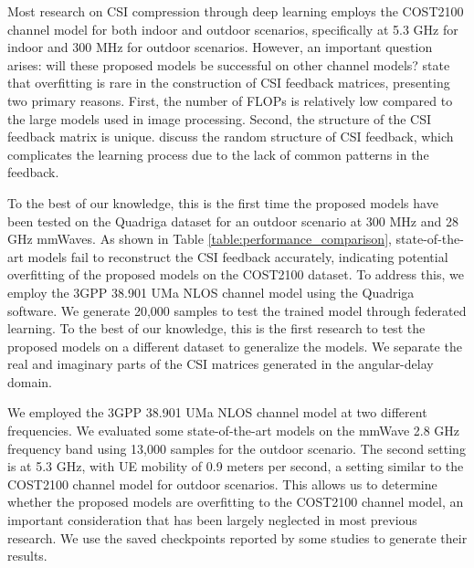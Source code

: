 \documentclass[lettersize,journal]{IEEEtran}
\begin{document}
Most research on CSI compression through deep learning employs the COST2100 channel model for both indoor and outdoor scenarios, specifically at 5.3 GHz for indoor and 300 MHz for outdoor scenarios. However, an important question arises: will these proposed models be successful on other channel models?
\cite{abn} state that overfitting is rare in the construction of CSI feedback matrices, presenting two primary reasons. First, the number of FLOPs is relatively low compared to the large models used in image processing. Second, the structure of the CSI feedback matrix is unique. \cite{abx} discuss the random structure of CSI feedback, which complicates the learning process due to the lack of common patterns in the feedback.

To the best of our knowledge, this is the first time the proposed models have been tested on the Quadriga dataset for an outdoor scenario at 300 MHz and 28 GHz mmWaves. As shown in Table
 \ref{table:performance_comparison}, state-of-the-art models fail to reconstruct the CSI feedback accurately, indicating potential overfitting of the proposed models on the COST2100 dataset. To address this, we employ the 3GPP 38.901 UMa NLOS channel model using the Quadriga software. We generate 20,000 samples to test the trained model through federated learning. To the best of our knowledge, this is the first research to test the proposed models on a different dataset to generalize the models. We separate the real and imaginary parts of the CSI matrices generated in the angular-delay domain.

We employed the 3GPP 38.901 UMa NLOS channel model at two different frequencies. We evaluated some state-of-the-art models on the mmWave 2.8 GHz frequency band using 13,000 samples for the outdoor scenario. The second setting is at 5.3 GHz, with UE mobility of 0.9 meters per second, a setting similar to the COST2100 channel model for outdoor scenarios. This allows us to determine whether the proposed models are overfitting to the COST2100 channel model, an important consideration that has been largely neglected in most previous research. We use the saved checkpoints reported by some studies to generate their results.

    
\end{document}
